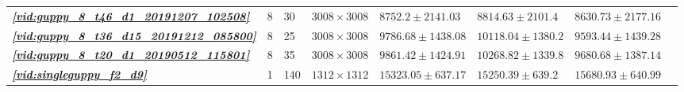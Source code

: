 \documentclass[9pt,lineno]{elife}
\newcommand{\vidref}[1]{\textit{\textbf{\ref{#1}}}}
\begin{document}
\begin{table}[h]
\begin{tabular}{l l l l | l l l l}
\vidref{vid:guppy_8_t46_d1_20191207_102508} & 8 & 30 & $ 3008 \times 3008 $ & $ 8752.2 \pm 2141.03 $ & $ 8814.63 \pm 2101.4 $ & $ 8630.73 \pm 2177.16 $ \\
\vidref{vid:guppy_8_t36_d15_20191212_085800} & 8 & 25 & $ 3008 \times 3008 $ & $ 9786.68 \pm 1438.08 $ & $ 10118.04 \pm 1380.2 $ & $ 9593.44 \pm 1439.28 $ \\
\vidref{vid:guppy_8_t20_d1_20190512_115801} & 8 & 35 & $ 3008 \times 3008 $ & $ 9861.42 \pm 1424.91 $ & $ 10268.82 \pm 1339.8 $ & $ 9680.68 \pm 1387.14 $ \\
\vidref{vid:singleguppy_f2_d9} & 1 & 140 & $ 1312 \times 1312 $ & $ 15323.05 \pm 637.17 $ & $ 15250.39 \pm 639.2 $ & $ 15680.93 \pm 640.99 $ \\
\bottomrule
\end{tabular}
\end{table}
\end{document}

